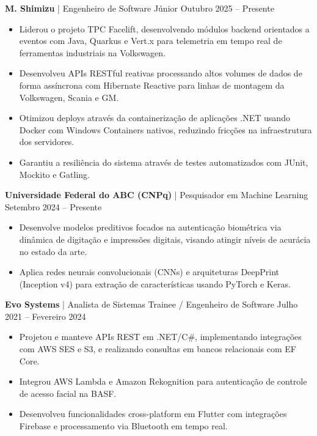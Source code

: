 \textbf{M. Shimizu} | Engenheiro de Software Júnior \hfill Outubro 2025 -- Presente \\ %
\vspace{-0.4cm}
\begin{itemize}[leftmargin=*, noitemsep]
    \item Liderou o projeto TPC Facelift, desenvolvendo módulos backend orientados a eventos com Java, Quarkus e Vert.x para telemetria em tempo real de ferramentas industriais na Volkswagen. %
    \item Desenvolveu APIs RESTful reativas processando altos volumes de dados de forma assíncrona com Hibernate Reactive para linhas de montagem da Volkswagen, Scania e GM. %
    \item Otimizou deploys através da containerização de aplicações .NET usando Docker com Windows Containers nativos, reduzindo fricções na infraestrutura dos servidores. %
    \item Garantiu a resiliência do sistema através de testes automatizados com JUnit, Mockito e Gatling. %
\end{itemize}

\textbf{Universidade Federal do ABC (CNPq)} | Pesquisador em Machine Learning \hfill Setembro 2024 -- Presente \\ %
\vspace{-0.4cm}
\begin{itemize}[leftmargin=*, noitemsep]
    \item Desenvolve modelos preditivos focados na autenticação biométrica via dinâmica de digitação e impressões digitais, visando atingir níveis de acurácia no estado da arte. %
    \item Aplica redes neurais convolucionais (CNNs) e arquiteturas DeepPrint (Inception v4) para extração de características usando PyTorch e Keras. %
\end{itemize}

\textbf{Evo Systems} | Analista de Sistemas Trainee / Engenheiro de Software \hfill Julho 2021 -- Fevereiro 2024 \\ %
\vspace{-0.4cm}
\begin{itemize}[leftmargin=*, noitemsep]
    \item Projetou e manteve APIs REST em .NET/C\#, implementando integrações com AWS SES e S3, e realizando consultas em bancos relacionais com EF Core. %
    \item Integrou AWS Lambda e Amazon Rekognition para autenticação de controle de acesso facial na BASF. %
    \item Desenvolveu funcionalidades cross-platform em Flutter com integrações Firebase e processamento via Bluetooth em tempo real. %
\end{itemize}
